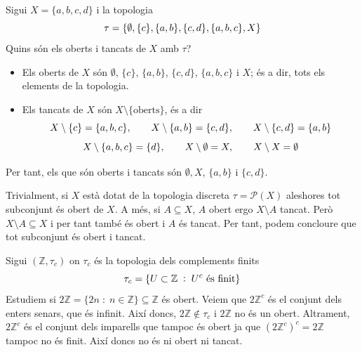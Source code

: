 \documentclass[../main.tex]{subfiles}
\begin{document}
\begin{ej}
\label{ej:obertsitancats3} Sigui $X = \{a,b,c,d\}$ i la topologia 
\begin{equation}
    \notag
    \tau = \{\emptyset,\{c\},\{a,b\},\{c,d\},\{a,b,c\},X\}
\end{equation}
Quins són els oberts i tancats de $X$ amb $\tau$?
\begin{itemize}
    \item Els oberts de $X$ són $\emptyset$, $\{c\}$, $\{a,b\}$, $\{c,d\}$, $\{a,b,c\}$ i $X$; és a dir, tots els elements de la topologia.
    \item Els tancats de $X$ són $X\setminus\{\text{oberts}\}$, és a dir
    \begin{equation}
        \notag
        X\setminus\{c\} = \{a,b,c\},\qquad X\setminus\{a,b\} = \{c,d\},\qquad X\setminus\{c,d\}=\{a,b\}
    \end{equation}
    \begin{equation}
        \notag
        X\setminus\{a,b,c\} = \{d\},\qquad X\setminus\emptyset = X,\qquad X\setminus X = \emptyset
    \end{equation}
\end{itemize}
Per tant, els que són oberts i tancats són $\emptyset, X$, $\{a,b\}$ i $\{c,d\}$.
\end{ej}

\begin{ej}
\label{ej:obertsitancats4} Trivialment, si $X$ està dotat de la topologia discreta $\tau = \mathscr{P}(X)$ aleshores tot subconjunt és obert de $X$. A més, si $A\subseteq X$, $A$ obert ergo $X\setminus A$ tancat. Però $X\setminus A\subseteq X$ i per tant també és obert i $A$ és tancat. Per tant, podem concloure que tot subconjunt és obert i tancat.
\end{ej}

\begin{ej}
\label{ej:obertsitancats5} Sigui $(\mathbb{Z},\tau_c)$ on $\tau_c$ és la topologia dels complements finits
\begin{equation}
    \notag
    \tau_c = \{U\subset\mathbb{Z}\;:\;\text{$U^c$ és finit}\}
\end{equation}
Estudiem si $2\mathbb{Z}=\{2n\;:\;n\in\mathbb{Z}\}\subseteq \mathbb{Z}$ és obert. Veiem que $2\mathbb{Z}^c$ és el conjunt dels enters senars, que és infinit. Així doncs, $2\mathbb{Z}\not\in\tau_c$ i $2\mathbb{Z}$ no és un obert. Altrament, $2\mathbb{Z}^c$ és el conjunt dels imparells que tampoc és obert ja que $(2\mathbb{Z}^c)^c = 2\mathbb{Z}$ tampoc no és finit. Així doncs no és ni obert ni tancat.
\end{ej}
\end{document}
